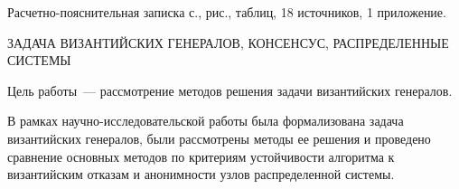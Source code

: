 

Расчетно-пояснительная записка \pageref{LastPage} с., \totalfigures{} рис., \totaltables{} таблиц, 18 источников, 1 приложение.


ЗАДАЧА ВИЗАНТИЙСКИХ ГЕНЕРАЛОВ, КОНСЕНСУС, РАСПРЕДЕЛЕННЫЕ СИСТЕМЫ

Цель работы~--- рассмотрение методов решения задачи византийских генералов.

В рамках научно-исследовательской работы была формализована задача византийских генералов, были рассмотрены методы ее решения и проведено сравнение основных методов по критериям устойчивости алгоритма к византийским отказам и анонимности узлов распределенной системы.


%

